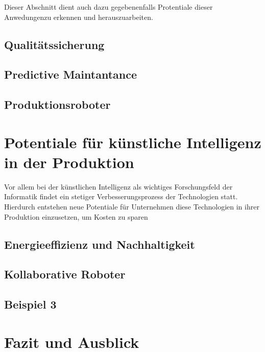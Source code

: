\documentclass[a4paper,12pt, german]{report}
\begin{document}
Dieser Abschnitt dient auch dazu gegebenenfalls Protentiale dieser Anwedungenzu erkennen und herauszuarbeiten.






\section{Qualitätssicherung}

\section{Predictive Maintantance}


\section{Produktionsroboter}



\chapter{Potentiale für künstliche Intelligenz in der Produktion}

Vor allem bei der künstlichen Intelligenz als wichtiges Forschungsfeld der Informatik findet ein stetiger Verbesserungsprozess der Technologien statt. Hierdurch entstehen neue Potentiale für Unternehmen diese Technologien in ihrer Produktion einzusetzen, um Kosten zu sparen









\section{Energieeffizienz und Nachhaltigkeit}

\section{Kollaborative Roboter}

\section{Beispiel 3}


\chapter{Fazit und Ausblick}

\listoffigures

\clearpage




\appendix
\end{document}
